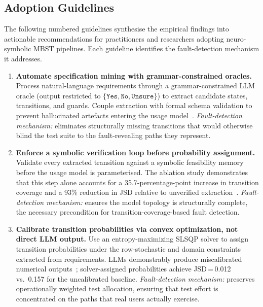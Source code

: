 \subsection{Adoption Guidelines}
\label{subsec:adoption}

The following numbered guidelines synthesise the empirical findings
into actionable recommendations for practitioners and researchers
adopting neuro-symbolic MBST pipelines.  Each guideline identifies
the fault-detection mechanism it addresses.

\begin{enumerate}

    \item \textbf{Automate specification mining with grammar-constrained
    oracles.}  Process natural-language requirements through a
    grammar-constrained LLM oracle (output restricted to
    $\{\texttt{Yes}, \texttt{No}, \texttt{Unsure}\}$) to extract
    candidate states, transitions, and guards.  Couple extraction with
    formal schema validation to prevent hallucinated artefacts entering
    the usage model~\cite{chatfume, formalising_requirements}.
    \emph{Fault-detection mechanism:} eliminates structurally missing
    transitions that would otherwise blind the test suite to the
    fault-revealing paths they represent.

    \item \textbf{Enforce a symbolic verification loop before
    probability assignment.}  Validate every extracted transition
    against a symbolic feasibility memory before the usage model is
    parameterised.  The ablation study demonstrates that this step
    alone accounts for a 35.7-percentage-point increase in transition
    coverage and a 93\% reduction in JSD relative to unverified
    extraction~\cite{angluin1987, boehr_constraints}.
    \emph{Fault-detection mechanism:} ensures the model topology is
    structurally complete, the necessary precondition for
    transition-coverage-based fault detection.

    \item \textbf{Calibrate transition probabilities via convex
    optimization, not direct LLM output.}  Use an entropy-maximizing
    SLSQP solver to assign transition probabilities under the
    row-stochastic and domain constraints extracted from requirements.
    LLMs demonstrably produce miscalibrated numerical
    outputs~\cite{llm_numerical_reasoning}; solver-assigned
    probabilities achieve JSD\,=\,0.012 vs.\ 0.157 for the
    uncalibrated baseline.
    \emph{Fault-detection mechanism:} preserves operationally weighted
    test allocation, ensuring that test effort is concentrated on
    the paths that real users actually exercise.


\end{enumerate}
